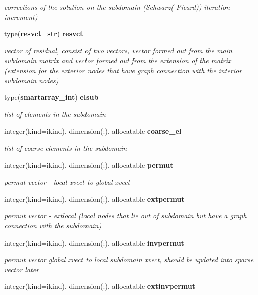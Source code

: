 \begin{DoxyCompactItemize}
\begin{DoxyCompactList}\small\item\em corrections of the solution on the subdomain (Schwarz(-\/\+Picard)) iteration increment) \end{DoxyCompactList}\item 
type({\bf resvct\+\_\+str}) {\bf resvct}
\begin{DoxyCompactList}\small\item\em vector of residual, consist of two vectors, vector formed out from the main subdomain matrix and vector formed out from the extension of the matrix (extension for the exterior nodes that have graph connection with the interior subdomain nodes) \end{DoxyCompactList}\item 
type({\bf smartarray\+\_\+int}) {\bf elsub}
\begin{DoxyCompactList}\small\item\em list of elements in the subdomain \end{DoxyCompactList}\item 
integer(kind=ikind), dimension(\+:), allocatable {\bf coarse\+\_\+el}
\begin{DoxyCompactList}\small\item\em list of coarse elements in the subdomain \end{DoxyCompactList}\item 
integer(kind=ikind), dimension(\+:), allocatable {\bf permut}
\begin{DoxyCompactList}\small\item\em permut vector -\/ local xvect to global xvect \end{DoxyCompactList}\item 
integer(kind=ikind), dimension(\+:), allocatable {\bf extpermut}
\begin{DoxyCompactList}\small\item\em permut vector -\/ extlocal (local nodes that lie out of subdomain but have a graph connection with the subdomain) \end{DoxyCompactList}\item 
integer(kind=ikind), dimension(\+:), allocatable {\bf invpermut}
\begin{DoxyCompactList}\small\item\em permut vector global xvect to local subdomain xvect, should be updated into sparse vector later \end{DoxyCompactList}\item 
integer(kind=ikind), dimension(\+:), allocatable {\bf extinvpermut}

\end{DoxyCompactItemize}
